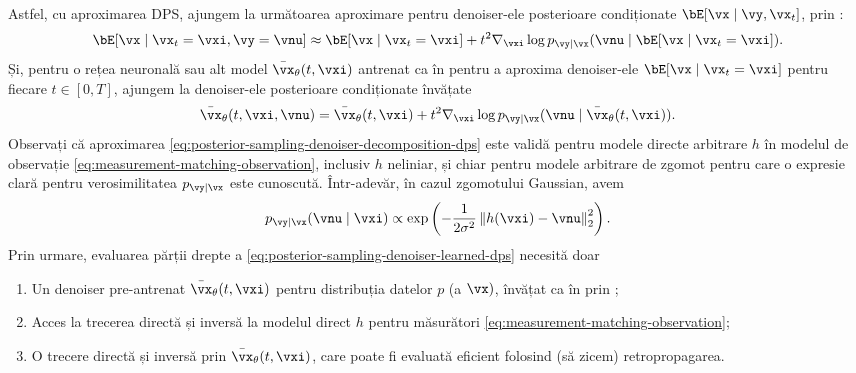 \documentclass[../../book-main_ro.tex]{subfiles}
\begin{document}
Astfel, cu aproximarea DPS, ajungem la următoarea aproximare pentru
denoiser-ele posterioare condiționate $\bE[\vx \mid \vy, \vx_t]$, prin
:
\begin{equation}
  \bE[ \vx \mid \vx_t=\vxi, \vy=\vnu]
  \approx
  \bE[\vx \mid \vx_t=\vxi] 
  + t^2 \nabla_{\vxi} \log p_{\vy \mid \vx}(\vnu \mid \bE[\vx \mid \vx_t = \vxi]).
  \label{eq:posterior-sampling-denoiser-decomposition-dps}
\end{equation}
Și, pentru o rețea neuronală sau alt model $\bar{\vx}_{\theta}(t, \vxi)$ 
antrenat ca în  pentru a aproxima denoiser-ele
$\bE[\vx \mid \vx_t = \vxi]$ pentru fiecare $t \in [0, T]$, ajungem la denoiser-ele
posterioare condiționate învățate
\begin{equation}
  \bar{\vx}_{\theta}(t, \vxi, \vnu) 
  = \bar{\vx}_{\theta}(t, \vxi)
  + t^2 \nabla_{\vxi} \log p_{\vy \mid \vx}(\vnu \mid \bar{\vx}_{\theta}(t,
  \vxi)).
  \label{eq:posterior-sampling-denoiser-learned-dps}
\end{equation}
Observați că aproximarea
\eqref{eq:posterior-sampling-denoiser-decomposition-dps} este validă pentru modele
directe arbitrare $h$ în
modelul de observație \eqref{eq:measurement-matching-observation}, inclusiv
$h$ neliniar, și chiar pentru
modele arbitrare de zgomot pentru care o expresie clară pentru verosimilitatea $p_{\vy
\mid \vx}$ este cunoscută. Într-adevăr, în cazul zgomotului Gaussian, avem
\begin{equation}
  p_{\vy \mid \vx}(\vnu \mid \vxi)
  \propto
  \exp\left(
    -\frac{1}{2\sigma^2} \norm*{ h(\vxi) - \vnu }_2^2
  \right).
\end{equation}
Prin urmare, evaluarea părții drepte a
\eqref{eq:posterior-sampling-denoiser-learned-dps}
necesită doar
\begin{enumerate}
  \item Un denoiser pre-antrenat $\bar{\vx}_{\theta}(t, \vxi)$ pentru distribuția datelor $p$
    (a $\vx)$, învățat ca în  prin
    ;
  \item Acces la trecerea directă și inversă la modelul direct $h$ pentru
    măsurători \eqref{eq:measurement-matching-observation};
  \item O trecere directă și inversă prin $\bar{\vx}_{\theta}(t, \vxi)$, care poate fi evaluată
    eficient folosind (să zicem) retropropagarea.
\end{enumerate}
\end{document}
